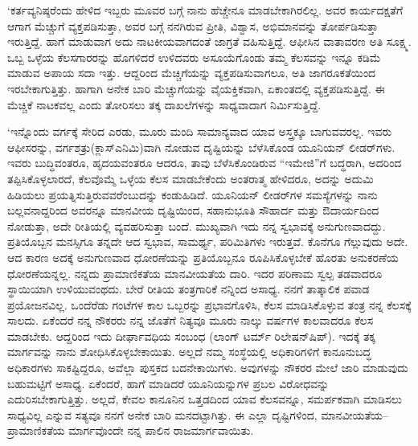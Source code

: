 ‘ಕರ್ತವ್ಯನಿಷ್ಠರೆಂದು ಹೇಳಿದ ಇಬ್ಬರು ಮೂವರ ಬಗ್ಗೆ ನಾನು ಹೆಚ್ಚೇನೂ ಮಾಡಬೇಕಾಗಿರಲಿಲ್ಲ. ಅವರ ಕಾರ್ಯದಕ್ಷತೆಗೆ ಆಗಾಗ ಮೆಚ್ಚುಗೆ ವ್ಯಕ್ತಪಡಿಸುತ್ತಾ, ಅವರ ಬಗ್ಗೆ ನನಗಿರುವ ಪ್ರೀತಿ, ವಿಶ್ವಾಸ, ಅಭಿಮಾನವನ್ನು ತೋರ್ಪಡಿಸುತ್ತಾ ಇರುತ್ತಿದ್ದೆ. ಹಾಗೆ ಮಾಡುವಾಗ ಅದು ನಾಟಕೀಯವಾಗದಂತೆ ಜಾಗ್ರತೆ ವಹಿಸುತ್ತಿದ್ದೆ. ಆಫೀಸಿನ ವಾತಾವರಣ ಅತಿ ಸೂಕ್ಷ್ಮ. ಒಬ್ಬ ಒಳ್ಳೆಯ ಕೆಲಸಗಾರರನ್ನು ಹೊಗಳಿದರೆ ಉಳಿದವರು ಅಸೂಯೆಗೊಂಡು ತಮ್ಮ ಕೆಲಸವನ್ನು ಇನ್ನೂ ಕಡಿಮೆ ಮಾಡುವ ಅಪಾಯ ಸದಾ ಇತ್ತು. ಆದ್ದರಿಂದ ಮೆಚ್ಚಿಗೆಯನ್ನು ವ್ಯಕ್ತಪಡಿಸುವಾಗಲೂ, ಅತಿ ಜಾಗರೂಕತೆಯಿಂದ ಇರಬೇಕಾಗುತ್ತಿತ್ತು. ಹಾಗಾಗಿ ಅನೇಕ ಬಾರಿ ಮೆಚ್ಚುಗೆಯನ್ನು ವೈಯಕ್ತಿಕವಾಗಿ, ಏಕಾಂತದಲ್ಲಿ ವ್ಯಕ್ತಪಡಿಸುತ್ತಿದ್ದೆ. ಈ ಮೆಚ್ಚಿಕೆ ನಾಟಕವಲ್ಲ ಎಂದು ತೋರಿಸಲು ತಕ್ಕ ದಾಖಲೆಗಳನ್ನು ಸಾಧ್ಯವಾದಾಗ ನಿರ್ಮಿಸುತ್ತಿದ್ದೆ.

‘ಇನ್ನೊಂದು ವರ್ಗಕ್ಕೆ ಸೇರಿದ ಎರಡು, ಮೂರು ಮಂದಿ ಸಾಮಾನ್ಯವಾದ ಯಾವ ಅಸ್ತ್ರಕ್ಕೂ ಬಾಗುವವರಲ್ಲ. ಇವರು ಆಫೀಸರನ್ನು, ವರ್ಗಶತ್ರು(ಕ್ಲಾಸ್​ಎನಿಮಿ)ವಾಗಿ ನೋಡುವ ದೃಷ್ಟಿಯನ್ನು ಬೆಳೆಸಿಕೊಂಡ ಯೂನಿಯನ್ ಲೀಡರ್​ಗಳು. ಇವರು ಬುದ್ಧಿವಂತರೂ, ಹೃದಯವಂತರೂ ಆದರೂ, ತಾವು ಬೆಳೆಸಿಕೊಂಡಿರುವ “ಇಮೇಜಿ”ಗೆ ಬದ್ಧರಾಗಿ, ಅದರಿಂದ ತಪ್ಪಿಸಿಕೊಳ್ಳಲಾರದೆ, ಕೆಲವೊಮ್ಮೆ ಒಳ್ಳೆಯ ಕೆಲಸ ಮಾಡಬೇಕೆಂದು ಅಂತರಾತ್ಮ ಹೇಳಿದರೂ, ಅದನ್ನು ಅದುಮಿ ಹಿಡಿ\-ಯಲು ಪ್ರಯತ್ನಿಸುತ್ತಿರುವವರೆಂಬುದನ್ನು ಕಂಡುಹಿಡಿದೆ. ಯೂನಿಯನ್ ಲೀಡರ್‌ಗಳ ಸಮಸ್ಯೆಗಳನ್ನು ನಾನು ಬಲ್ಲವನಾದ್ದರಿಂದ ಅವರನ್ನೂ ಮಾನವೀಯ ದೃಷ್ಟಿಯಿಂದ, ಸಹಾನುಭೂತಿ ಸೌಹಾರ್ದ ಮತ್ತು ಔದಾರ್ಯದಿಂದ ನೋಡುತ್ತಾ, ಅದೇ ರೀತಿಯಲ್ಲಿ ವ್ಯವಹರಿಸುತ್ತಾ ಬಂದೆ. ಮುಖ್ಯವಾಗಿ ಇದು ನನ್ನ ಸ್ವಭಾವಕ್ಕೆ ಅನುಗುಣವಾದದ್ದು. ಪ್ರತಿಯೊಬ್ಬನ ಮನಸ್ಸಿಗೂ ತನ್ನದೇ ಆದ ಸ್ವಭಾವ, ಸಾಮರ್ಥ್ಯ, ಪರಿಮಿತಿಗಳು ಇರುತ್ತವೆ. ಕೊನೆಗೂ ಗೆಲ್ಲುವುದು ಅದೇ. ಆದ ಕಾರಣ ಅದಕ್ಕೆ ಅನುಗುಣವಾದ ಧೋರಣೆಯನ್ನು ಪ್ರತಿಯೊಬ್ಬನೂ ರೂಪಿಸಿಕೊಳ್ಳಬೇಕೆ ಹೊರತು ಅನುಕರಣೆಯ ಧೋರಣೆಯನ್ನಲ್ಲ. ನನ್ನದು ಪ್ರಾಮಾಣಿಕತೆಯ ಮಾನವೀಯತೆಯ ದಾರಿ. ಇದರ ಪರಿಣಾಮ ಸ್ವಲ್ಪ ತಡವಾದರೂ ಸ್ಥಾಯಿಯಾಗಿ ಉಳಿಯುವಂಥದು. ಬೇರೆ ರೀತಿಯ ತಂತ್ರಗಾರಿಕೆ ನನ್ನಿಂದ ಅಸಾಧ್ಯ. ನನಗೆ ತಾತ್ಕಾಲಿಕ ಪವಾಡ ಪ್ರಯೋಜನವಿಲ್ಲ. ಒಂದೆರೆಡು ಗಂಟೆಗಳ ಕಾಲ ಒಬ್ಬರನ್ನು ಪ್ರಭಾವಗೊಳಿಸಿ, ಕೆಲಸ ಮಾಡಿಸಿಕೊಳ್ಳುವ ತಂತ್ರ ನನ್ನ ಕೆಲಸಕ್ಕೆ ಸಾಲದು. ಏಕೆಂದರೆ ನನ್ನ ನೌಕರರು ನನ್ನ ಜೊತೆಗೆ ನಿತ್ಯವೂ ಮೂರು ನಾಲ್ಕು ವರ್ಷಗಳ ಕಾಲವಾದರೂ ಕೆಲಸ ಮಾಡಬೇಕು. ಆದ್ದರಿಂದ ಇದು ದೀರ್ಘಾವಧಿಯ ಸಂಬಂಧ (ಲಾಂಗ್ ಟರ್ಮ್ ರಿಲೇಷನ್​\-ಷಿಪ್​). ಇದಕ್ಕೆ ತಕ್ಕ ಮಾರ್ಗವನ್ನು ನಾನು ಶೋಧಿಸಿಕೊಳ್ಳಬೇಕಾಯಿತು. ಅಲ್ಲದೆ ನಮ್ಮ ಸಂಸ್ಥೆಯಲ್ಲಿ ಅಧಿಕಾರಿಗಳಿಗೆ ಕಾನೂನುಬದ್ಧ ಅಧಿಕಾರಗಳು ಸಾಕಷ್ಟಿದ್ದರೂ, ಅವೆಲ್ಲಾ ಪುಸ್ತಕದ ಬದನೇಕಾಯಿಗಳು. ಅವುಗಳನ್ನು ನೌಕರರ ಮೇಲೆ ಜಾರಿ ಮಾಡುವುದು ಬಹುಮಟ್ಟಿಗೆ ಅಸಾಧ್ಯ. ಏಕೆಂದರೆ, ಹಾಗೆ ಮಾಡಿದರೆ ಯೂನಿಯನ್ನುಗಳ ಪ್ರಬಲ ವಿರೋಧವನ್ನು ಎದುರಿಸಬೇಕಾಗುತ್ತಿತ್ತು. ಅಲ್ಲದೆ, ಕೇವಲ ಕಾನೂನಿನ ಒತ್ತಡದಿಂದ ಯಾವ ಕೆಲಸವನ್ನೂ, ಸಮರ್ಪಕವಾಗಿ ಮಾಡಿಸಲು ಸಾಧ್ಯವಿಲ್ಲ ಎನ್ನುವ ಸತ್ಯವೂ ನನಗೆ ಅನೇಕ ಬಾರಿ ಮನದಟ್ಟಾಗಿತ್ತು. ಈ ಎಲ್ಲಾ ದೃಷ್ಟಿಗಳಿಂದ, ಮಾನವೀಯತೆಯ–ಪ್ರಾಮಾಣಿಕತೆಯ ಮಾರ್ಗವೊಂದೇ ನನ್ನ ಪಾಲಿನ ರಾಜ\-ಮಾರ್ಗ\-ವಾಯಿತು.

